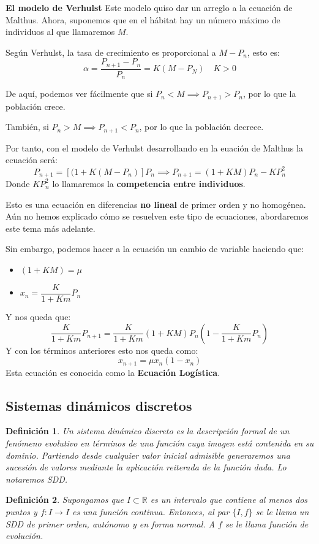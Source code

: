\documentclass[11pt, a4paper, titlepage]{article}
\newcommand{\R}{\mathbb{R}}
\theoremstyle{theorem-style}
\theoremstyle{definition-style}
\newtheorem*{ndef}{Definición}
\theoremstyle{remark-style}
\theoremstyle{example-style}
\begin{document}
\textbf{El modelo de Verhulst}
Este modelo quiso dar un arreglo a la ecuación de Malthus. Ahora, suponemos que en el hábitat hay un número máximo de individuos al que llamaremos $M$.

Según Verhulst, la tasa de crecimiento es proporcional a $M-P_n$, esto es:
\[
\alpha = \dfrac{P_{n+1}-P_n}{P_n} = K (M-P_N) \quad K > 0
\]

De aquí, podemos ver fácilmente que si $P_n < M \implies P_{n+1} > P_n$, por lo que la población crece.

También, si $P_n > M \implies P_{n+1} < P_n$, por lo que la población decrece.

Por tanto, con el modelo de Verhulst desarrollando en la euación de Malthus la ecuación será:
\[
P_{n+1} = [(1+K(M-P_n)]P_n \implies P_{n+1} = (1+KM)P_n -KP_n^2
\]
Donde $KP_n^2$ lo llamaremos la \textbf{competencia entre individuos}.

Esto es una ecuación en diferencias \textbf{no lineal} de primer orden y no homogénea. Aún no hemos explicado cómo se resuelven este tipo de ecuaciones, abordaremos este tema más adelante.

Sin embargo, podemos hacer a la ecuación un cambio de variable haciendo que:
\begin{itemize}
	\item $(1+KM) = \mu$
	\item $x_n = \dfrac{K}{1+Km}P_n$
\end{itemize} 
Y nos queda que:
\[
\dfrac{K}{1+Km}P_{n+1} = \dfrac{K}{1+Km}(1+KM)P_n ( 1 - \dfrac{K}{1+Km}P_n)
\]
Y con los términos anteriores esto nos queda como:
\[
x_{n+1} = \mu x_n(1-x_n)
\]
Esta ecuación es conocida como la \textbf{Ecuación Logística}.

\subsection{Sistemas dinámicos discretos}

\begin{ndef}
	Un sistema dinámico discreto es la descripción formal de un fenómeno evolutivo en términos de una función cuya imagen está contenida en su dominio. Partiendo desde cualquier valor inicial admisible generaremos una sucesión de valores mediante la aplicación reiterada de la función dada. Lo notaremos SDD.
\end{ndef}

\begin{ndef}
	Supongamos que $I \subset \R$ es un intervalo que contiene al menos dos puntos y $f:I \to I$ es una función continua. Entonces, al par $\{I,f\}$ se le llama un SDD de primer orden, autónomo y en forma normal. A $f$ se le llama función de evolución.
\end{ndef}
\end{document}
